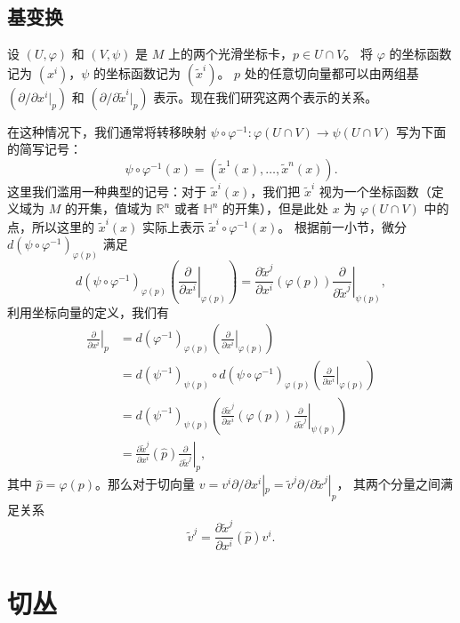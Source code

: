 \documentclass[fontset=none]{Notes}
\begin{document}
\subsection{基变换}

设 $(U,\varphi)$ 和 $(V,\psi)$ 是 $M$ 上的两个光滑坐标卡，$p\in U\cap V$。
将 $\varphi$ 的坐标函数记为 $(x^i)$，$\psi$ 的坐标函数记为 $(\tilde{x}^i)$。
$p$ 处的任意切向量都可以由两组基 $\left(\partial/\partial x^i|_p\right)$
和 $\left(\partial/\partial \tilde{x}^i|_p\right)$ 表示。现在我们研究这两个表示的关系。

在这种情况下，我们通常将转移映射 $\psi\circ\varphi^{-1}:\varphi(U\cap V)\to\psi(U\cap V)$
写为下面的简写记号：
\[
  \psi\circ\varphi^{-1}(x)=\left(\tilde{x}^1(x),\dots,\tilde{x}^n(x)\right)  .
\]
这里我们滥用一种典型的记号：对于 $\tilde{x}^i(x)$，我们把 $\tilde{x}^i$
视为一个坐标函数（定义域为 $M$ 的开集，值域为 $\mathbb{R}^n$ 或者 $\mathbb{H}^n$
的开集），但是此处 $x$ 为 $\varphi(U\cap V)$ 中的点，所以这里的
$\tilde{x}^i(x)$ 实际上表示 $\tilde{x}^i\circ\varphi^{-1}(x)$。
根据前一小节，微分 $d(\psi\circ\varphi^{-1})_{\varphi(p)}$ 满足
\[
  d(\psi\circ\varphi^{-1})_{\varphi(p)}\left(
    \left.\frac{\partial}{\partial x^i}\right|_{\varphi(p)}
  \right)  =\frac{\partial \tilde{x}^j}{\partial x^i}(\varphi(p))
  \left.\frac{\partial }{\partial \tilde x^j}\right|_{\psi(p)},
\]
利用坐标向量的定义，我们有
\begin{align*}
  \left.\frac{\partial}{\partial x^i}\right|_p&=d(\varphi^{-1})_{\varphi(p)}
  \left(
    \left.\frac{\partial}{\partial x^i}\right|_{\varphi(p)}
  \right)\\
  &=d(\psi^{-1})_{\psi(p)}\circ d(\psi\circ\varphi^{-1})_{\varphi(p)}
  \left(
    \left.\frac{\partial}{\partial x^i}\right|_{\varphi(p)}
  \right)\\
  &=d(\psi^{-1})_{\psi(p)}\left(
    \frac{\partial \tilde{x}^j}{\partial x^i}(\varphi(p))
  \left.\frac{\partial }{\partial \tilde x^j}\right|_{\psi(p)}
  \right)\\
  &=\frac{\partial \tilde{x}^j}{\partial x^i}(\hat p)
  \left.\frac{\partial }{\partial \tilde x^j}\right|_{p},
\end{align*}
其中 $\hat p=\varphi(p)$。那么对于切向量 $v=v^i\partial/\partial x^i|_p=\tilde{v}^j\partial/\partial\tilde{x}^j|_p$，
其两个分量之间满足关系
\[
  \tilde{v}^j=\frac{\partial\tilde{ x}^j}{\partial x^i}(\hat p) v^i.  
\]

\section{切丛}
\end{document}

